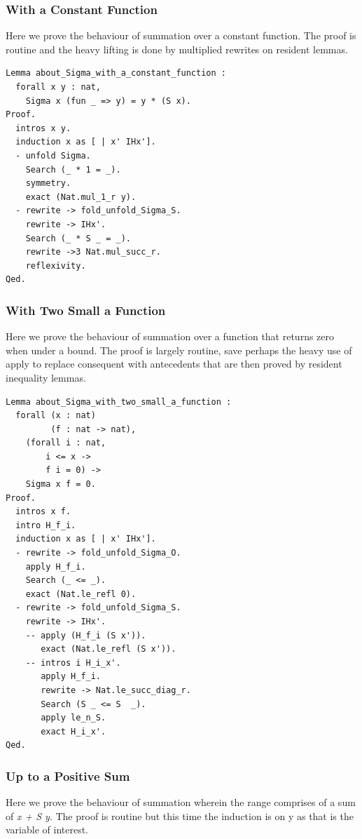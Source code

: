 \documentclass{article}
\begin{document}
\subsubsection{With a Constant Function}
Here we prove the behaviour of summation over a constant function. The proof is routine and the heavy lifting is done by multiplied rewrites on resident lemmas.

\begin{lstlisting}
Lemma about_Sigma_with_a_constant_function :
  forall x y : nat,
    Sigma x (fun _ => y) = y * (S x).
Proof.
  intros x y.
  induction x as [ | x' IHx'].
  - unfold Sigma. 
    Search (_ * 1 = _).
    symmetry.
    exact (Nat.mul_1_r y).
  - rewrite -> fold_unfold_Sigma_S.
    rewrite -> IHx'.
    Search (_ * S _ = _).
    rewrite ->3 Nat.mul_succ_r.
    reflexivity.
Qed.

\end{lstlisting}

\subsubsection{With Two Small a Function}
Here we prove the behaviour of summation over a function that returns zero when under a bound. The proof is largely routine, save perhaps the heavy use of apply to replace consequent with antecedents that are then proved by resident inequality lemmas.

\begin{lstlisting}
Lemma about_Sigma_with_two_small_a_function :
  forall (x : nat)
         (f : nat -> nat),
    (forall i : nat,
        i <= x ->
        f i = 0) ->
    Sigma x f = 0.
Proof.
  intros x f.
  intro H_f_i.
  induction x as [ | x' IHx'].
  - rewrite -> fold_unfold_Sigma_O.
    apply H_f_i.
    Search (_ <= _).
    exact (Nat.le_refl 0).
  - rewrite -> fold_unfold_Sigma_S.     
    rewrite -> IHx'.
    -- apply (H_f_i (S x')). 
       exact (Nat.le_refl (S x')).
    -- intros i H_i_x'.    
       apply H_f_i.
       rewrite -> Nat.le_succ_diag_r.
       Search (S _ <= S  _).
       apply le_n_S.
       exact H_i_x'.
Qed.
\end{lstlisting}

\subsubsection{Up to a Positive Sum}
Here we prove the behaviour of summation wherein the range comprises of a sum of \textit{x + S y}. The proof is routine but this time the induction is on y as that is the variable of interest.
\end{document}
